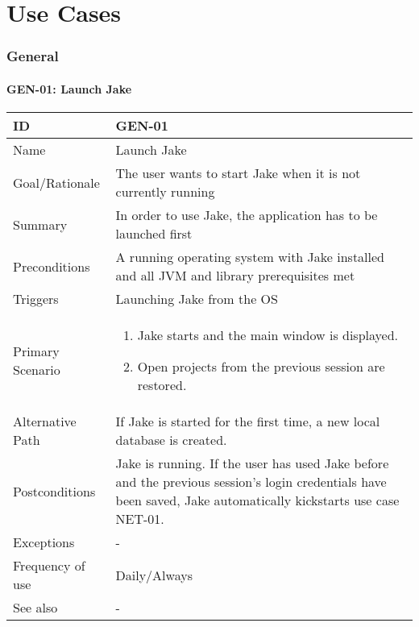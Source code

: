 \part{Use Cases}
\section{General}

\def\ucreset{
\def\ucid{-}
\def\ucname{-}
\def\ucstatus{-} %
\def\ucrationale{-}
\def\ucsummary{-}
\def\ucpreconditions{-}
\def\uctriggers{-}
\def\ucprimaryscenario{-}
\def\ucalternativepath{-}
\def\ucexceptions{-}
\def\ucpostconditions{-}
\def\ucfrequency{-}
\def\ucsee{-}
}

\def\ucprint{
\subsection{\ucid: \ucname}
\begin{tabular}{|p{3.3cm}|p{12cm}|}
\hline
ID & \ucid \\ 
\hline 
Name & \ucname \\
\hline
Goal/Rationale & \ucrationale \\ 
\hline 
Summary & \ucsummary \\ 
\hline
Preconditions & \ucpreconditions \\
\hline
Triggers & \uctriggers \\
\hline
Primary Scenario & \ucprimaryscenario \\
\hline
Alternative Path & \ucalternativepath \\
\hline
Postconditions & \ucpostconditions  \\
\hline
Exceptions & \ucexceptions \\
\hline
Frequency of use & \ucfrequency  \\
\hline
See also & \ucsee \\
\hline
\end{tabular}
}


\ucreset
\def\ucid{GEN-01}
\def\ucname{Launch Jake}
\def\ucstatus{Review required} %
\def\ucrationale{The user wants to start Jake when it is not currently running}
\def\ucsummary{In order to use Jake, the application has to be launched first}
\def\ucpreconditions{A running operating system with Jake installed and all JVM and library prerequisites met}
\def\uctriggers{Launching Jake from the OS}
\def\ucprimaryscenario{
\begin{enumerate}
\item Jake starts and the main window is displayed.
\item Open projects from the previous session are restored.
\end{enumerate}}
\def\ucalternativepath{If Jake is started for the first time, a new local database is created.}
\def\ucpostconditions{Jake is running. If the user has used Jake before and the previous session's login credentials have been saved, Jake automatically kickstarts use case NET-01.}
\def\ucfrequency{Daily/Always}
\ucprint

